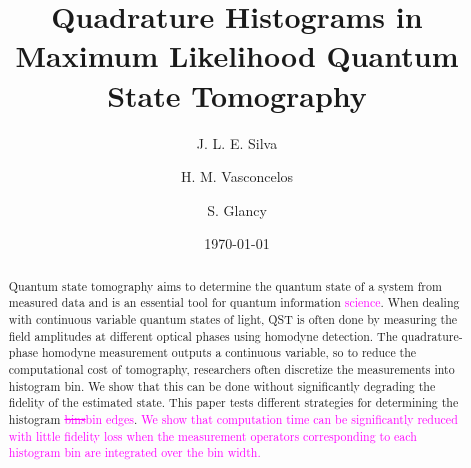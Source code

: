 \documentclass[
reprint,
superscriptaddress,
showpacs,
amsmath,
amssymb,
aps,
pra,
longbibliography
]{revtex4-1}
\providecommand{\aucmnt}[1]{#1}
\providecommand{\editcolor}[2]{\textcolor{#1}{#2}}
\providecommand{\aucmnt}[1]{}
\providecommand{\editcolor}[2]{#2}
\newcommand{\SG}[1]{\editcolor{magenta}{#1}}
\newcommand{\SGs}[1]{\aucmnt{\editcolor{magenta}{\sout{#1}}}}
\begin{document}

\title{Quadrature Histograms in Maximum Likelihood Quantum State Tomography}%
\author{J. L. E. Silva}
\author{H. M. Vasconcelos}
\author{S. Glancy}


\date{\today}%

\begin{abstract}
  Quantum state tomography aims to determine the quantum state of a
  system from measured data and is an essential tool for quantum
  information \SG{science}.  When dealing with continuous variable
  quantum states of light, QST is often done by measuring the field
  amplitudes at different optical phases using homodyne detection.
  The quadrature-phase homodyne measurement outputs a continuous
  variable, so to reduce the computational cost of tomography,
  researchers often discretize the measurements into histogram bin.
  We show that this can be done without significantly degrading the
  fidelity of the estimated state.  This paper tests different
  strategies for determining the histogram \SGs{bins}\SG{bin edges}.
  \SG{We show that computation time can be significantly reduced with
    little fidelity loss when the measurement operators corresponding
    to each histogram bin are integrated over the bin width.}
\end{abstract}

\maketitle
\end{document}
